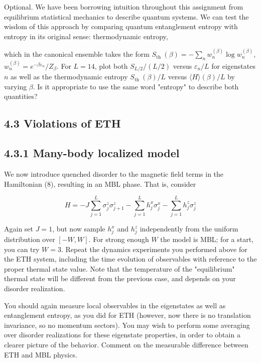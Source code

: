\documentclass[12pt]{article}
\begin{document}
Optional. We have been borrowing intuition throughout this assignment from equilibrium statistical mechanics to describe quantum systems. We can test the wisdom of this approach by comparing quantum entanglement entropy with entropy in its original sense: thermodynamic entropy,

which in the canonical ensemble takes the form $S_{\text {th }}(\beta)=-\sum_{n} w_{n}^{(\beta)} \log w_{n}^{(\beta)}$, $w_{n}^{(\beta)}=e^{-\beta \varepsilon_{n}} / Z_{\beta}$. For $L=14$, plot both $S_{L / 2} /(L / 2)$ versus $\varepsilon_{n} / L$ for eigenstates $n$ as well as the thermodynamic entropy $S_{\text {th }}(\beta) / L$ versus $\langle H\rangle(\beta) / L$ by varying $\beta$. Is it appropriate to use the same word "entropy" to describe both quantities?

\subsection*{4.3 Violations of ETH}
\subsection*{4.3.1 Many-body localized model}
We now introduce quenched disorder to the magnetic field terms in the Hamiltonian (8), resulting in an MBL phase. That is, consider


\begin{equation*}
H=-J \sum_{j=1}^{L} \sigma_{j}^{z} \sigma_{j+1}^{z}-\sum_{j=1}^{L} h_{j}^{x} \sigma_{j}^{x}-\sum_{j=1}^{L} h_{j}^{z} \sigma_{j}^{z} \tag{11}
\end{equation*}


Again set $J=1$, but now sample $h_{j}^{x}$ and $h_{j}^{z}$ independently from the uniform distribution over $[-W, W]$. For strong enough $W$ the model is MBL; for a start, you can try $W=3$. Repeat the dynamics experiments you performed above for the ETH system, including the time evolution of observables with reference to the proper thermal state value. Note that the temperature of the "equilibrium" thermal state will be different from the previous case, and depends on your disorder realization.

You should again measure local observables in the eigenstates as well as entanglement entropy, as you did for ETH (however, now there is no translation invariance, so no momentum sectors). You may wish to perform some averaging over disorder realizations for these eigenstate properties, in order to obtain a clearer picture of the behavior. Comment on the measurable difference between ETH and MBL physics.
\end{document}
